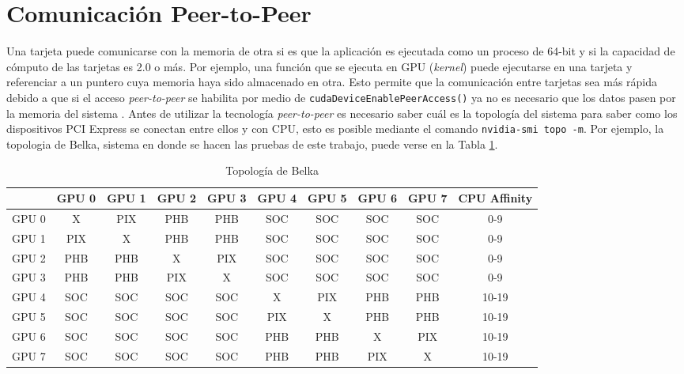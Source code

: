 \section{Comunicación Peer-to-Peer}
Una tarjeta puede comunicarse con la memoria de otra si es que la aplicación es ejecutada como un proceso de 64-bit y si la capacidad de cómputo de las tarjetas es 2.0 o más. Por ejemplo, una función que se ejecuta en GPU (\textit{kernel}) puede ejecutarse en una tarjeta y referenciar a un puntero cuya memoria haya sido almacenado en otra. Esto permite que la comunicación entre tarjetas sea más rápida debido a que si el acceso \textit{peer-to-peer} se habilita por medio de \texttt{cudaDeviceEnablePeerAccess()} ya no es necesario que los datos pasen por la memoria del sistema \citep{cuda}.
Antes de utilizar la tecnología \textit{peer-to-peer} es necesario saber cuál es la topología del sistema para saber como los dispositivos PCI Express se conectan entre ellos y con CPU, esto es posible mediante el comando \texttt{nvidia-smi topo -m}. Por ejemplo, la topologia de Belka, sistema en donde se hacen las pruebas de este trabajo, puede verse en la Tabla \ref{tab:topology}.

\begin{table}[h!]
	\centering
	\begin{tabular}{@{}cccccccccc@{}}
		\toprule
		      & GPU 0 & GPU 1 & GPU 2 & GPU 3 & GPU 4 & GPU 5 & GPU 6 & GPU 7 & CPU Affinity \\ \midrule
		GPU 0 & X     & PIX   & PHB   & PHB   & SOC   & SOC   & SOC   & SOC   & 0-9          \\
		GPU 1 & PIX   & X     & PHB   & PHB   & SOC   & SOC   & SOC   & SOC   & 0-9          \\
		GPU 2 & PHB   & PHB   & X     & PIX   & SOC   & SOC   & SOC   & SOC   & 0-9          \\
		GPU 3 & PHB   & PHB   & PIX   & X     & SOC   & SOC   & SOC   & SOC   & 0-9          \\
		GPU 4 & SOC   & SOC   & SOC   & SOC   & X     & PIX   & PHB   & PHB   & 10-19        \\
		GPU 5 & SOC   & SOC   & SOC   & SOC   & PIX   & X     & PHB   & PHB   & 10-19        \\
		GPU 6 & SOC   & SOC   & SOC   & SOC   & PHB   & PHB   & X     & PIX   & 10-19        \\
		GPU 7 & SOC   & SOC   & SOC   & SOC   & PHB   & PHB   & PIX   & X     & 10-19        \\ \bottomrule
	\end{tabular}
	\caption{Topología de Belka}
	\label{tab:topology}
\end{table}

